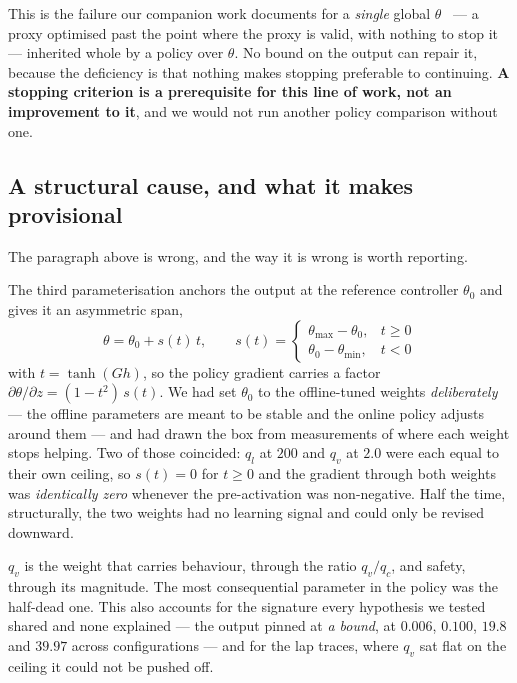 \documentclass[letterpaper, 10 pt, conference]{ieeeconf}
\begin{document}
This is the failure our companion work documents for a \emph{single} global
$\theta$~\cite{paper1} --- a proxy optimised past the point where the proxy is
valid, with nothing to stop it --- inherited whole by a policy over $\theta$. No
bound on the output can repair it, because the deficiency is that nothing makes
stopping preferable to continuing. \textbf{A stopping criterion is a
prerequisite for this line of work, not an improvement to it}, and we would not
run another policy comparison without one.

\subsection{A structural cause, and what it makes
provisional}\label{sec:deadspan}
The paragraph above is wrong, and the way it is wrong is worth reporting.

The third parameterisation anchors the output at the reference controller
$\theta_0$ and gives it an asymmetric span,
%
\begin{equation}
  \theta = \theta_0 + s(t)\,t, \qquad
  s(t) = \begin{cases} \theta_{\max} - \theta_0, & t \ge 0\\
                       \theta_0 - \theta_{\min}, & t < 0\end{cases}
  \label{eq:span}
\end{equation}
%
with $t = \tanh(Gh)$, so the policy gradient carries a factor
$\partial\theta/\partial z = (1 - t^2)\,s(t)$. We had set $\theta_0$ to the
offline-tuned weights \emph{deliberately} --- the offline parameters are meant
to be stable and the online policy adjusts around them --- and had drawn the
box from measurements of where each weight stops helping. Two of those
coincided: $q_l$ at $200$ and $q_v$ at $2.0$ were each equal to their own
ceiling, so $s(t) = 0$ for $t \ge 0$ and the gradient through both weights was
\emph{identically zero} whenever the pre-activation was non-negative. Half the
time, structurally, the two weights had no learning signal and could only be
revised downward.

$q_v$ is the weight that carries behaviour, through the ratio $q_v/q_c$, and
safety, through its magnitude. The most consequential parameter in the policy
was the half-dead one. This also accounts for the signature every
hypothesis we tested shared and none explained --- the output pinned at
\emph{a bound}, at $0.006$, $0.100$, $19.8$ and $39.97$ across configurations
--- and for the lap traces, where $q_v$ sat flat on the ceiling it could not
be pushed off.
\end{document}
